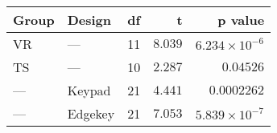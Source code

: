 \begin{tabular}{llrrr}
\toprule
Group &   Design &  df &       t &               p value \\
\midrule
   VR &      --- &  11 & $8.039$ & $6.234\times 10^{-6}$ \\
   TS &      --- &  10 & $2.287$ &             $0.04526$ \\
  --- &   Keypad &  21 & $4.441$ &           $0.0002262$ \\
  --- &  Edgekey &  21 & $7.053$ & $5.839\times 10^{-7}$ \\
\bottomrule
\end{tabular}

